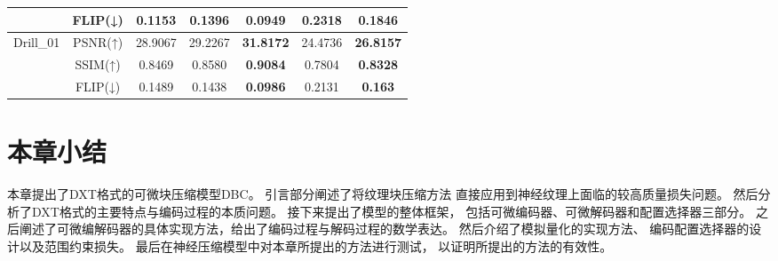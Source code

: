 \begin{table*}[t]
{\begin{tabular}{ccccccc}
                                             & FLIP(↓) & 0.1153 & 0.1396 & \textbf{0.0949} & 0.2318 & \textbf{0.1846} \\
        \midrule
        \multirow{3}{*}{Drill\_01}           & PSNR(↑) & 28.9067 & 29.2267 & \textbf{31.8172} & 24.4736 & \textbf{26.8157} \\
                                             & SSIM(↑) & 0.8469 & 0.8580 & \textbf{0.9084} & 0.7804 & \textbf{0.8328} \\
                                             & FLIP(↓) & 0.1489 & 0.1438 & \textbf{0.0986} & 0.2131 & \textbf{0.163} \\
        \bottomrule
    \end{tabular}
}   
\end{table*}

\section{本章小结}

本章提出了DXT格式的可微块压缩模型DBC。
引言部分阐述了将纹理块压缩方法
直接应用到神经纹理上面临的较高质量损失问题。
然后分析了DXT格式的主要特点与编码过程的本质问题。
接下来提出了模型的整体框架，
包括可微编码器、可微解码器和配置选择器三部分。
之后阐述了可微编解码器的具体实现方法，给出了编码过程与解码过程的数学表达。
然后介绍了模拟量化的实现方法、
编码配置选择器的设计以及范围约束损失。
最后在神经压缩模型中对本章所提出的方法进行测试，
以证明所提出的方法的有效性。



